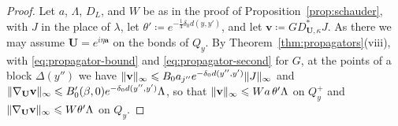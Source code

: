 \documentclass[11pt]{preprint}
\DeclarePairedDelimiter{\norm}{\lVert}{\rVert}
\numberwithin{equation}{section}
\begin{document}
\begin{proof}
Let $a$, $\Lambda$, $D_L$, and $W$ be as in the proof of Proposition~\ref{prop:schauder}, with $J$ in the place of $\lambda$, let $\theta' \coloneqq e^{-\frac{1}{4}\delta_0d(y, y')}$, and let $\mathbf v \coloneqq GD^*_{\mathbf U,\kappa}J$. As there we may assume $\mathbf U = e^{i\eta\mathbf a}$ on the bonds of $Q_y$. By Theorem~\ref{thm:propagators}(viii), with \eqref{eq:propagator-bound} and \eqref{eq:propagator-second} for $G$, at the points of a block $\Delta(y'')$ we have $\norm{\mathbf v}_\infty \leqslant B_0a_{j''}e^{-\delta_0d(y'', y')}\norm J_\infty$ and $\norm{\nabla_{\mathbf U}\mathbf v}_\infty \leqslant B'_0(\beta, 0)e^{-\delta_0d(y'', y')}\Lambda$, so that $\norm{\mathbf v}_\infty \leqslant Wa\,\theta'\Lambda$ on $Q^+_y$ and $\norm{\nabla_{\mathbf U}\mathbf v}_\infty \leqslant W\theta'\Lambda$ on $Q_y$.


\end{proof}
\end{document}
